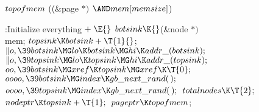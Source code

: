 \Y\B\4\D$\\{topofmem}$ \5
((\&{page} ${}{*}){}$ ${}{\AND}\\{mem}[\\{memsize}]{}$)\par
\Y\B\4:Initialize everything\X${}\mathrel+\E{}$\6
$\\{botsink}\K{}$(\&{node} ${}{*}){}$ \\{mem};\6
${}\\{topsink}\K\\{botsink}+\T{1}{}$;\6
${}\|o,\39\\{botsink}\MG\\{lo}\K\\{botsink}\MG\\{hi}\K\\{addr\_}(%
\\{botsink});{}$\6
${}\|o,\39\\{topsink}\MG\\{lo}\K\\{topsink}\MG\\{hi}\K\\{addr\_}(%
\\{topsink});{}$\6
${}\\{oo},\39\\{botsink}\MG\\{xref}\K\\{topsink}\MG\\{xref}\K\T{0};{}$\6
${}\\{oooo},\39\\{botsink}\MG\\{index}\K\\{gb\_next\_rand}(\,);{}$\6
${}\\{oooo},\39\\{topsink}\MG\\{index}\K\\{gb\_next\_rand}(\,);{}$\6
${}\\{totalnodes}\K\T{2};{}$\6
${}\\{nodeptr}\K\\{topsink}+\T{1};{}$\6
${}\\{pageptr}\K\\{topofmem}{}$;\par
\fi

